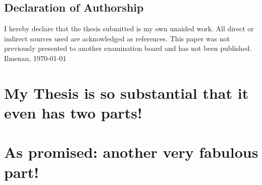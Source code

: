\documentclass[DIV=11, pagesize, oneside, 11pt ]{scrbook} %
\begin{document}
\frontmatter
\clearpage
{}







\chapter*{Declaration of Authorship}
I hereby declare that the thesis submitted is my own unaided work. All direct or indirect sources used are acknowledged as references. This paper was not previously presented to another examination board and has not
been published.
\\[20.ex]

\noindent Ilmenau,  \today \hspace{0.675\linewidth} 


\cleardoublepage
\hypersetup{linkcolor=black}
\tableofcontents
\hypersetup{linkcolor=mDarkTeal}



\mainmatter
{}


\part{My Thesis is so substantial that it even has two parts!} %

\part{As promised: another very fabulous part!}




\backmatter
\printbibliography[title=References]



\printglossary[type=symbols,style=topicmcols, title={List of Symbols}]



 
\end{document}
